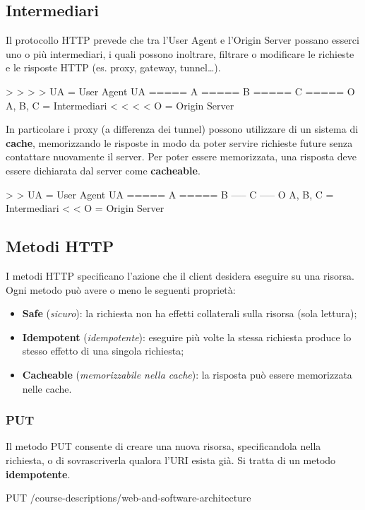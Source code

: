 \documentclass[12pt]{article}
\begin{document}
\subsection{Intermediari}
Il protocollo HTTP prevede che tra l'User Agent e l'Origin Server possano esserci uno o più intermediari,
i quali possono inoltrare, filtrare o modificare le richieste e le risposte HTTP (es. proxy, gateway, tunnel\dots).
\begin{code}
       >       >       >       >                      UA = User Agent
  UA ===== A ===== B ===== C ===== O           A, B, C = Intermediari
       <       <       <       <                    O = Origin Server
\end{code}
In particolare i proxy (a differenza dei tunnel) possono utilizzare di un sistema di \textbf{cache}, memorizzando le risposte in modo da poter servire richieste future senza contattare nuovamente il server.
Per poter essere memorizzata, una risposta deve essere dichiarata dal server come \textbf{cacheable}.
\begin{code}
       >       >                                      UA = User Agent
  UA ===== A ===== B ----- C ----- O           A, B, C = Intermediari
       <       <                                    O = Origin Server
\end{code}

\subsection{Metodi HTTP}
I metodi HTTP specificano l'azione che il client desidera eseguire su una risorsa.\\
Ogni metodo può avere o meno le seguenti proprietà:
\begin{itemize}
  \item \textbf{Safe} (\textit{sicuro}): la richiesta non ha effetti collaterali sulla risorsa (sola lettura);
  \item \textbf{Idempotent} (\textit{idempotente}): eseguire più volte la stessa richiesta produce lo stesso effetto di una singola richiesta;
  \item \textbf{Cacheable} (\textit{memorizzabile nella cache}): la risposta può essere memorizzata nelle cache.
\end{itemize}

\subsubsection{PUT}
Il metodo PUT consente di creare una nuova risorsa, specificandola nella richiesta, o di sovrascriverla qualora l'URI esista già. 
Si tratta di un metodo \textbf{idempotente}.
\begin{code}[language=HTTP]
  PUT /course-descriptions/web-and-software-architecture
\end{code}
\end{document}
